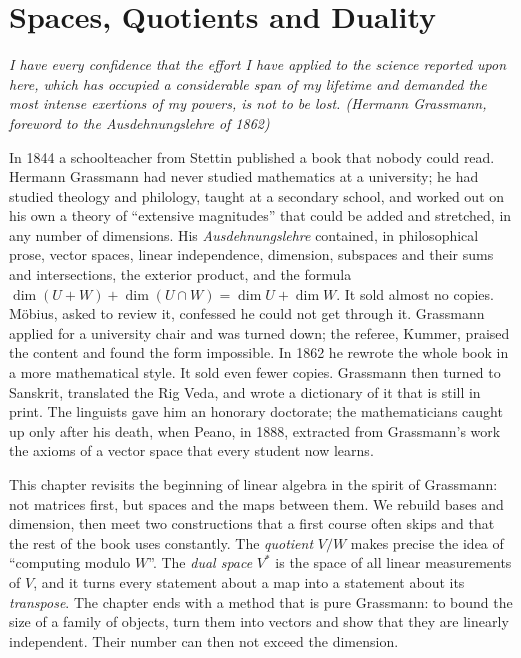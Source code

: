 \chapter{Spaces, Quotients and Duality}\label{ch:duality}

\begin{center}\itshape
I have every confidence that the effort I have applied to the science reported upon here, which has occupied a
considerable span of my lifetime and demanded the most intense exertions of my powers, is not to be lost.
\upshape(Hermann Grassmann, foreword to the \emph{Ausdehnungslehre} of 1862)
\end{center}

In 1844 a schoolteacher from Stettin published a book that nobody could read. Hermann Grassmann had never studied
mathematics at a university; he had studied theology and philology, taught at a secondary school, and worked out on his
own a theory of ``extensive magnitudes'' that could be added and stretched, in any number of dimensions. His
\emph{Ausdehnungslehre} contained, in philosophical prose, vector spaces, linear independence, dimension, subspaces and
their sums and intersections, the exterior product, and the formula $\dim(U+W)+\dim(U\cap W)=\dim U+\dim W$. It sold
almost no copies. M\"obius, asked to review it, confessed he could not get through it. Grassmann applied for a
university chair and was turned down; the referee, Kummer, praised the content and found the form impossible. In 1862 he rewrote the whole book in a more mathematical style. It sold even fewer copies. Grassmann
then turned to Sanskrit, translated the Rig Veda, and wrote a dictionary of it that is still in print. The linguists
gave him an honorary doctorate; the mathematicians caught up only after his death, when Peano, in 1888, extracted from
Grassmann's work the axioms of a vector space that every student now learns.

This chapter revisits the beginning of linear algebra in the spirit of Grassmann: not matrices first, but spaces and
the maps between them. We rebuild bases and dimension, then meet two constructions that a first course often skips and
that the rest of the book uses constantly. The \emph{quotient} $V/W$ makes precise the idea of ``computing modulo $W$''.
The \emph{dual space} $V^*$ is the space of all linear measurements of $V$, and it turns every statement about a map into
a statement about its \emph{transpose}. The chapter ends with a method that is pure Grassmann: to bound the size of a
family of objects, turn them into vectors and show that they are linearly independent. Their number can then not
exceed the dimension.

